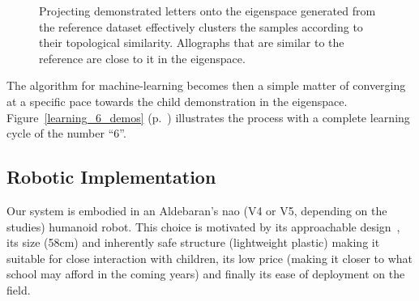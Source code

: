 \documentclass{article}
\begin{document}
\begin{figure}[ht!]
    \centering

    \caption{\small Projecting demonstrated letters onto the eigenspace
    generated from the reference dataset effectively clusters the samples
    according to their topological similarity. Allographs that are similar to
    the reference are close to it in the eigenspace.}
    \label{fig:h}
\end{figure}

The algorithm for machine-learning becomes then a simple matter of converging at
a specific pace towards the child demonstration in the eigenspace.
Figure~\ref{learning_6_demos} (p.~\pageref{learning_6_demos}) illustrates the
process with a complete learning cycle of the number ``6''.

\subsection{Robotic Implementation}

Our system is embodied in an Aldebaran's {\sc nao} (V4 or V5, depending on the
studies) humanoid robot. This choice is motivated by its approachable
design~\cite{Gouaillier2008}, its size (58cm) and inherently safe structure
(lightweight plastic) making it suitable for close interaction with children,
its low price (making it closer to what school may afford in the coming years)
and finally its ease of deployment on the field.
\end{document}
